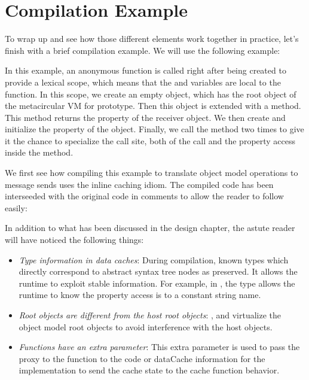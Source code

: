 \section{Compilation Example}

To wrap up and see how those different elements work together in practice,
let's finish with a brief compilation example. We will use the following example:


In this example, an anonymous function is called right after being created to
provide a lexical scope, which means that the  and  variables are
local to the function. In this scope, we create an  empty object, which
has the root object of the metacircular VM for prototype. Then this object is
extended with a  method. This method returns the  property of
the receiver object. We then create and initialize the  property of the
 object. Finally, we call the  method two times to give it the
chance to specialize the call site, both of the  call and the 
property access inside the  method.

We first see how compiling this example to translate object model operations to
message sends uses the inline caching idiom. The compiled code has been
interseeded with the original code in comments to allow the reader to follow
easily:


\newpage

In addition to what has been discussed in the design chapter, the astute reader will have noticed the following things:
\begin{itemize}
    \item \textit{Type information in data caches}: During compilation, known
    types which directly correspond to abstract syntax tree nodes as preserved.
    It allows the runtime to exploit stable information. For example, in
    , the  type allows the runtime to know the
    property access is to a constant string name.    
    \item \textit{Root objects are different from the host root objects}:
    ,  and  virtualize the
    object model root objects to avoid interference with the host objects.
    \item \textit{Functions have an extra  parameter}: This extra
    parameter is used to pass the proxy to the function to the code or
    dataCache information for the implementation to send the cache state to the
    cache function behavior.
\end{itemize}

